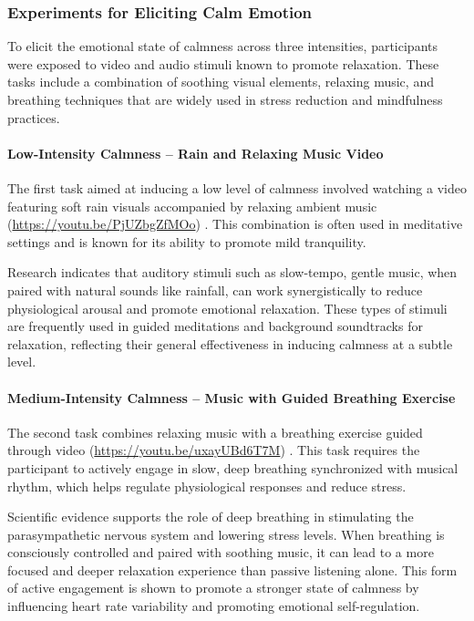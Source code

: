 \subsubsection{Experiments for Eliciting Calm Emotion}

To elicit the emotional state of calmness across three intensities, participants were exposed to video and audio stimuli known to promote relaxation. These tasks include a combination of soothing visual elements, relaxing music, and breathing techniques that are widely used in stress reduction and mindfulness practices.

\paragraph*{Low-Intensity Calmness – Rain and Relaxing Music Video}

The first task aimed at inducing a low level of calmness involved watching a video featuring soft rain visuals accompanied by relaxing ambient music (\url{https://youtu.be/PjUZbgZfMOo}) \citep{jm_professor_relaxing_music}. This combination is often used in meditative settings and is known for its ability to promote mild tranquility.

Research indicates that auditory stimuli such as slow-tempo, gentle music, when paired with natural sounds like rainfall, can work synergistically to reduce physiological arousal and promote emotional relaxation. These types of stimuli are frequently used in guided meditations and background soundtracks for relaxation, reflecting their general effectiveness in inducing calmness at a subtle level.

\paragraph*{Medium-Intensity Calmness – Music with Guided Breathing Exercise}

The second task combines relaxing music with a breathing exercise guided through video (\url{https://youtu.be/uxayUBd6T7M}) \citep{calm2020breathe}. This task requires the participant to actively engage in slow, deep breathing synchronized with musical rhythm, which helps regulate physiological responses and reduce stress.

Scientific evidence supports the role of deep breathing in stimulating the parasympathetic nervous system and lowering stress levels. When breathing is consciously controlled and paired with soothing music, it can lead to a more focused and deeper relaxation experience than passive listening alone. This form of active engagement is shown to promote a stronger state of calmness by influencing heart rate variability and promoting emotional self-regulation.

